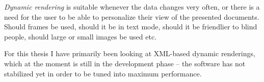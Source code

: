 \textit{Dynamic rendering} is suitable whenever the data changes very
often, or there is a need  for the user to be able to personalize
their view of the presented documents.   Should frames be used, should
it be in text mode, should it be friendlier to blind people, should
large or small images be used etc.

For this thesis I have primarily been looking at XML-based dynamic
renderings, which at the moment is still in the development phase --
the software has not stabilized yet in order to be tuned into maximum
performance.










